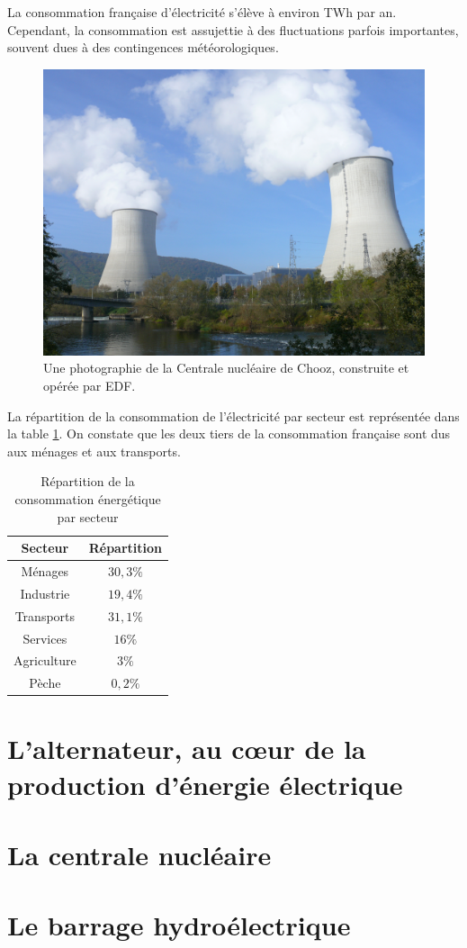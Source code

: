 \documentclass[12pt,a4paper,oneside,openany]{memoir}
\begin{document}
La consommation française d'électricité s'élève à environ \unit[480]{TWh} par an. Cependant, la consommation est assujettie à des fluctuations parfois importantes, souvent dues à des contingences météorologiques. 

\begin{figure}[h]
	\includegraphics[width=\textwidth]{img/centrale1.jpeg}
	\caption[Une photographie de la Centrale nucléaire de Chooz]{Une photographie de la Centrale nucléaire de Chooz, construite et opérée par EDF.}
\end{figure}

La répartition de la consommation de l'électricité par secteur est représentée dans la table \ref{repartition secteur}. On constate que les deux tiers de la consommation française sont dus aux ménages et aux transports.



	\begin{table}[h]
		\centering
		\begin{tabular}{cc}
			\toprule
			Secteur & Répartition\\
			\midrule
			Ménages & $30,3\%$ \\ 
			Industrie & $19,4\%$ \\ 
			Transports & $31,1\%$ \\ 
			Services & $16\%$ \\ 
			Agriculture & $3\%$ \\ 
			Pèche & $0,2\%$ \\ 
			\bottomrule
		\end{tabular} 
		\caption{Répartition de la consommation énergétique par secteur}
		\label{repartition secteur}
	\end{table}













\chapter{L'alternateur, au cœur de la production d'énergie électrique}

\chapter{La centrale nucléaire}

\chapter{Le barrage hydroélectrique}
\end{document}
